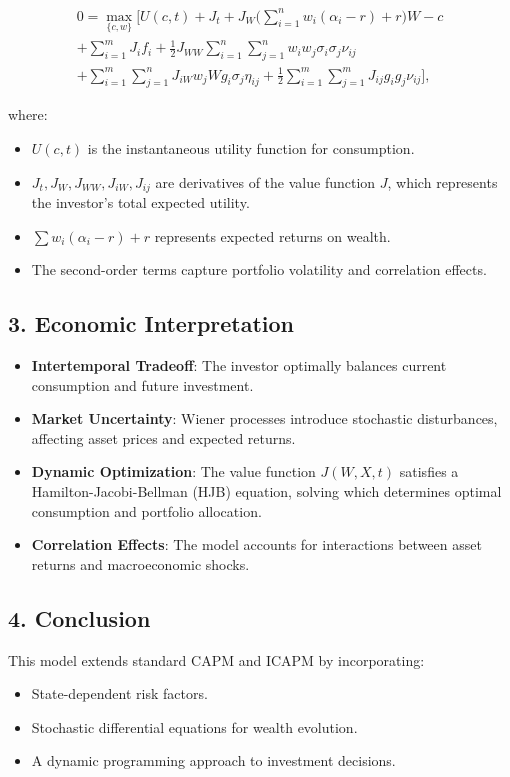 \documentclass{article}
\begin{document}
\begin{align*}
0 = \max_{\{c, w\}} \Bigg[ U(c,t) + J_t + J_W \Bigg( \sum_{i=1}^{n} w_i (\alpha_i - r) + r \Bigg) W - c \\
+ \sum_{i=1}^{m} J_i f_i + \frac{1}{2} J_{WW} \sum_{i=1}^{n} \sum_{j=1}^{n} w_i w_j \sigma_i \sigma_j \nu_{ij} \\
+ \sum_{i=1}^{m} \sum_{j=1}^{n} J_{iW} w_j W g_i \sigma_j \eta_{ij} + \frac{1}{2} \sum_{i=1}^{m} \sum_{j=1}^{m} J_{ij} g_i g_j \nu_{ij} \Bigg],
\end{align*}

where:
\begin{itemize}
    \item \( U(c,t) \) is the instantaneous utility function for consumption.
    \item \( J_t, J_W, J_{WW}, J_{iW}, J_{ij} \) are derivatives of the value function \( J \), which represents the investor’s total expected utility.
    \item \( \sum w_i (\alpha_i - r) + r \) represents expected returns on wealth.
    \item The second-order terms capture portfolio volatility and correlation effects.
\end{itemize}

\subsection*{3. Economic Interpretation}
\begin{itemize}
    \item \textbf{Intertemporal Tradeoff}: The investor optimally balances current consumption and future investment.
    \item \textbf{Market Uncertainty}: Wiener processes introduce stochastic disturbances, affecting asset prices and expected returns.
    \item \textbf{Dynamic Optimization}: The value function \( J(W, X, t) \) satisfies a Hamilton-Jacobi-Bellman (HJB) equation, solving which determines optimal consumption and portfolio allocation.
    \item \textbf{Correlation Effects}: The model accounts for interactions between asset returns and macroeconomic shocks.
\end{itemize}

\subsection*{4. Conclusion}
This model extends standard CAPM and ICAPM by incorporating:
\begin{itemize}
    \item State-dependent risk factors.
    \item Stochastic differential equations for wealth evolution.
    \item A dynamic programming approach to investment decisions.
\end{itemize}
\end{document}
